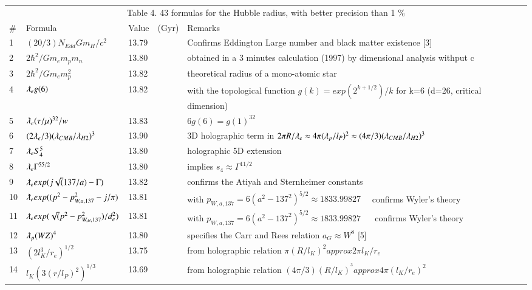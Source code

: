 \documentclass[a4paper,9pt]{article}
\begin{document}
\begin{table}
\label{tab:4:table4}
  \hskip-2.0cm\begin{tabular}{llll}
    \toprule
    \multicolumn{4}{c}{Table 4. 43 formulas for the Hubble radius, with better precision than 1 \%}                   \\
    \cmidrule(r){1-4}
   \#     & Formula     & Value~~(Gyr) & Remarks \\
    \midrule
    
    
    1 & $(20/3)N_{Edd}Gm_H/c^2$ & 13.79 & Confirms Eddington Large number and black matter existence [3] \\
    2 & $2\hbar^2/Gm_em_pm_n$ & 13.80 & obtained in a 3 minutes calculation (1997) by dimensional analysis withput c\\
    3 & $2\hbar^2/Gm_em_p^2$ & 13.82 & theoretical radius of a mono-atomic star\\
    4 & $\lambdabar_{e} g(6)$ & 13.82 & with the topological function $g(k)=exp(2^{k+1/2})/k$ for k=6 (d=26, critical dimension)\\
    5 & $\lambdabar_{e} (\tau/\mu)^{32}/w$ & 13.83 & $6g(6) = g(1)^{32}$\\     
    6 & $(2\lambdabar_{e}/3)(\lambdabar_{CMB}/\lambdabar_{H2})^3$ & 13.90 & 3D holographic term in $2\pi R/\lambdabar_{e} \approx 4\pi (\lambdabar_{p}/l_P)^2 \approx (4\pi /3) (\lambdabar_{CMB}/\lambdabar_{H2})^3$ \\
    7 & $\lambdabar_{e} S_4^5$ & 13.80 & holographic 5D extension\\
    8 & $\lambdabar_{e} \Gamma^{55/2}$ & 13.80 & implies $s_4 \approx \Gamma^{11/2}$\\
    9 & $\lambdabar_{e} exp(j\sqrt (137/a) - \Gamma)$ & 13.82 &confirms the Atiyah and Sternheimer constants\\ 
    10 & $\lambdabar_{e} exp((p^2-p_{W,a,137}^2 - j/\pi)$ & 13.81 & with $p_{W,a,137} = 6(a^2 - 137^2)^{5/2} \approx 1833.99827$~~ confirms Wyler's theory\\ 
    11 & $\lambdabar_{e} exp(\sqrt (p^2-p_{W,a,137}^2)/d_e^2)$ & 13.81 & with $p_{W,a,137} = 6(a^2 - 137^2)^{5/2} \approx 1833.99827$ ~~ confirms Wyler's theory\\ 
    12 & $\lambdabar_{p} {(WZ)}^{4}$ & 13.80 & specifies the Carr and Rees relation $a_G \approx W^8$ [5] \\
    13 &  $(2l_K^3/r_e)^{1/2}$ & 13.75 & from holographic relation $\pi(R/l_K)^2 approx 2\pi l_K/r_e$  \\
    14 &  $l_K(3(r/l_P)^2)^{1/3}$ & 13.69 & from holographic relation $(4\pi/3) (R/l_K)^^3  approx 4\pi (l_K/r_e)^2$ \\

\end{tabular}
\end{table}
\end{document}
